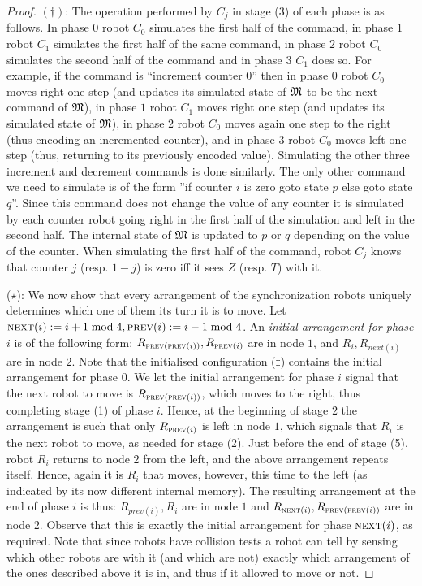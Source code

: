 \documentclass{llncs}
\def\next{\textsc{next}}
\def\prev{\textsc{prev}}
\newcommand{\round}{\ensuremath{R}}
\newcommand{\zero}{\ensuremath{Z}}
\newcommand{\zeroTest}{\ensuremath{T}}
\newcommand{\counter}{\ensuremath{C}}
\begin{document}
\begin{proof}
$(\dagger)$: The operation performed by $\counter_j$ in stage (3) of each phase is as follows.
In phase $0$ robot $\counter_0$ simulates the first half of the command, in phase $1$ robot $\counter_1$ simulates the first half of the same command, in phase $2$ robot $\counter_0$ simulates the second half of the command and in phase $3$ $\counter_1$ does so. For example, if the command is ``increment counter $0$'' then in phase $0$ robot $\counter_0$ moves right one step (and updates its simulated state of $\mathfrak{M}$ to be the next command of $\mathfrak{M}$), in phase $1$ robot $\counter_1$ moves right one step (and updates its simulated state of $\mathfrak{M}$), in phase $2$ robot $\counter_0$ moves again one step to the right (thus encoding an incremented counter), and in phase $3$ robot $\counter_0$ moves left one step (thus, returning to its previously encoded value). Simulating the other three increment and decrement commands is done similarly. The only other command we need to simulate is of the form ''if counter $i$ is zero goto state $p$ else goto state $q$''. Since this command does not change the value of any counter it is simulated by each counter robot going right in the first half of the simulation and left in the second half. The internal state of $\mathfrak{M}$ is updated to $p$ or $q$ depending on the value of the counter. When simulating the first half of the command, robot $\counter_j$ knows that counter $j$ (resp. $1-j$) is zero iff it sees $\zero$ (resp. $\zeroTest$) with it.

($\star$): We now show that every arrangement of the synchronization robots uniquely determines which one of them its turn it is to move. Let $\next(i) := i+1 \bmod 4, \prev(i) := i-1 \bmod 4$. An {\em initial arrangement for phase $i$} is of the following form: $\round_{\prev(\prev(i))}, \round_{\prev(i)}$ are in node $1$, and $\round_i, \round_{next(i)}$ are in node $2$. Note that the initialised configuration ($\ddagger$) contains the initial arrangement for phase $0$. We let the initial arrangement for phase $i$ signal that the next robot to move is $\round_{\prev(\prev(i))}$, which moves to the right, thus completing stage (1) of phase $i$. Hence, at the beginning of stage $2$ the arrangement is such that only $\round_{\prev(i)}$ is left in node $1$, which signals that $\round_i$ is the next robot to move, as needed for stage (2). Just before the end of stage (5), robot $\round_i$  returns to node $2$ from the left, and the above arrangement repeats itself. Hence, again it is $\round_i$ that moves, however, this time to the left (as indicated by its now different internal memory). The resulting arrangement at the end of phase $i$ is thus: $\round_{prev(i)}, \round_i$ are in node $1$ and $\round_{\next(i)}, \round_{\prev(\prev(i))}$ are in node $2$. Observe that this is exactly the initial arrangement for phase $\next(i)$, as required. Note that since robots have collision tests a robot can tell by sensing which other robots are with it (and which are not) exactly which arrangement of the ones described above it is in, and thus if it allowed to move or not.


\end{proof}
\end{document}

